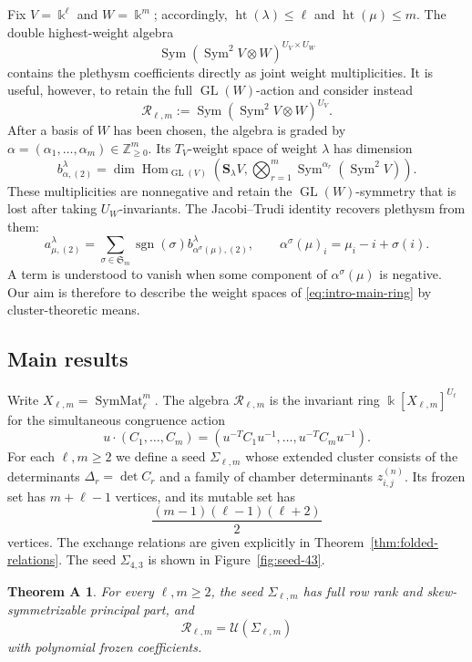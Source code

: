 \documentclass[11pt]{amsart}
\newtheorem*{theoremA}{Theorem A}
\theoremstyle{definition}
\theoremstyle{remark}
\newcommand{\kk}{\Bbbk}
\newcommand{\GL}{\operatorname{GL}}
\newcommand{\Sym}{\operatorname{Sym}}
\newcommand{\SymMat}{\operatorname{SymMat}}
\newcommand{\htp}{\operatorname{ht}}
\newcommand{\cR}{\mathcal R}
\newcommand{\frakS}{\mathfrak S}
\begin{document}
Fix $V=\kk^\ell$ and $W=\kk^m$; accordingly,
$\htp(\lambda)\leq\ell$ and $\htp(\mu)\leq m$.  The double highest-weight algebra
\[ \Sym(\Sym^2V\otimes W)^{U_V\times U_W} \]
contains the plethysm coefficients directly as joint weight
multiplicities.  It is useful, however, to retain the full $\GL(W)$-action
and consider instead
\begin{equation}
 \cR_{\ell,m}:=\Sym(\Sym^2V\otimes W)^{U_V}.
 \label{eq:intro-main-ring}
\end{equation}
After a basis of $W$ has been chosen, the algebra is graded by
$\alpha=(\alpha_1,\ldots,\alpha_m)\in\mathbb Z_{\ge0}^m$.  Its
$T_V$-weight space of weight $\lambda$ has dimension
\[ b_{\alpha,(2)}^\lambda =\dim\operatorname{Hom}_{\GL(V)}\!\left( \mathbf S_\lambda V, \bigotimes_{r=1}^m\Sym^{\alpha_r}(\Sym^2V) \right). \]
These multiplicities are nonnegative and retain the $\GL(W)$-symmetry that
is lost after taking $U_W$-invariants.  The Jacobi--Trudi identity recovers
plethysm from them:
\begin{equation}
 a_{\mu,(2)}^\lambda
 =\sum_{\sigma\in\frakS_m}\operatorname{sgn}(\sigma)
   b_{\alpha^\sigma(\mu),(2)}^\lambda,
 \qquad
 \alpha^\sigma(\mu)_i=\mu_i-i+\sigma(i).
 \label{eq:intro-JT}
\end{equation}
A term is understood to vanish when some component of
$\alpha^\sigma(\mu)$ is negative.  Our aim is therefore to describe the
weight spaces of \eqref{eq:intro-main-ring} by cluster-theoretic means.

\subsection{Main results}

Write $X_{\ell,m}=\SymMat_\ell^m$.  The algebra
$\cR_{\ell,m}$ is the invariant ring $\kk[X_{\ell,m}]^{U_\ell}$ for the
simultaneous congruence action
\[ u\cdot(C_1,\ldots,C_m) =(u^{-T}C_1u^{-1},\ldots,u^{-T}C_mu^{-1}). \]
For each $\ell,m\ge2$ we define a seed $\Sigma_{\ell,m}$ whose extended
cluster consists of the determinants $\Delta_r=\det C_r$ and a family of
chamber determinants $z_{i,j}^{(n)}$.  Its frozen set has $m+\ell-1$
vertices, and its mutable set has
\[ \frac{(m-1)(\ell-1)(\ell+2)}2 \]
vertices.  The exchange relations are given explicitly in
Theorem~\ref{thm:folded-relations}.
The seed $\Sigma_{4,3}$ is shown in Figure~\ref{fig:seed-43}.

\begin{theoremA}
For every $\ell,m\ge2$, the seed $\Sigma_{\ell,m}$ has full row rank and
skew-symmetrizable principal part, and
\[ \cR_{\ell,m}=\mathcal U(\Sigma_{\ell,m}) \]
with polynomial frozen coefficients.
\end{theoremA}
\end{document}
